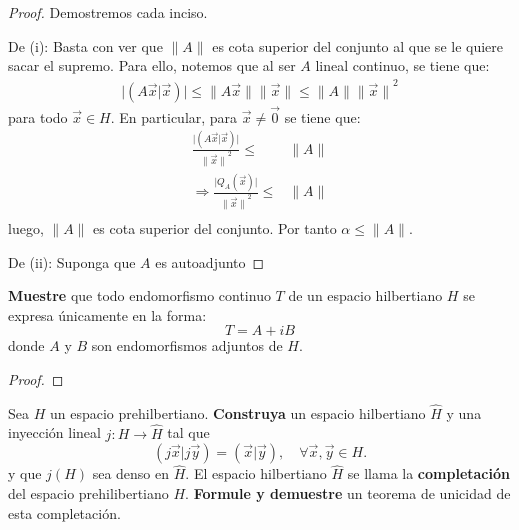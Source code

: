 \documentclass[12pt]{report}
\theoremstyle{largebreak}
\newcommand\abs[1]{\ensuremath{\big|#1\big|}}
\newcommand\cf[3]{\ensuremath{#1:#2\rightarrow#3}}
\newcommand\pint[2]{\ensuremath{\left(#1\big|#2\right)}}
\newcommand\norm[1]{\ensuremath{\|#1\|}}
\begin{document}
    \begin{proof}
        Demostremos cada inciso.

        De (i): Basta con ver que $\norm{A}$ es cota superior del conjunto al que se le quiere sacar el supremo. Para ello, notemos que al ser $A$ lineal continuo, se tiene que:
        \begin{equation*}
            \begin{split}
                \abs{\pint{A\vec{x}}{\vec{x}}} \leq \norm{A\vec{x}}\norm{\vec{x}}\leq\norm{A}\norm{\vec{x}}^2
            \end{split}
        \end{equation*}
        para todo $\vec{x}\in H$. En particular, para $\vec{x}\neq\vec{0}$ se tiene que:
        \begin{equation*}
            \begin{split}
                \frac{\abs{\pint{A\vec{x}}{\vec{x}}}}{\norm{\vec{x}}^2}\leq&\norm{A}\\
                \Rightarrow \frac{\abs{Q_A(\vec{x})}}{\norm{\vec{x}}^2}\leq&\norm{A}\\
            \end{split}
        \end{equation*}
        luego, $\norm{A}$ es cota superior del conjunto. Por tanto $\alpha\leq\norm{A}$.

        De (ii): Suponga que $A$ es autoadjunto
    \end{proof}

    \begin{excer}
        \textbf{Muestre} que todo endomorfismo continuo $T$ de un espacio hilbertiano $H$ se expresa únicamente en la forma:
        \begin{equation*}
            T=A+iB
        \end{equation*}
        donde $A$ y $B$ son endomorfismos adjuntos de $H$.
    \end{excer}

    \begin{proof}
        
    \end{proof}

    \begin{excer}
        Sea $H$ un espacio prehilbertiano. \textbf{Construya} un espacio hilbertiano $\hat{H}$ y una inyección lineal $\cf{j}{H}{\hat{H}}$ tal que
        \begin{equation*}
            \pint{j\vec{x}}{j\vec{y}}=\pint{\vec{x}}{\vec{y}},\quad\forall\vec{x},\vec{y}\in H.
        \end{equation*}
        y que $j(H)$ sea denso en $\hat{H}$. El espacio hilbertiano $\hat{H}$ se llama la \textbf{completación} del espacio prehilibertiano $H$. \textbf{Formule y demuestre} un teorema de unicidad de esta completación.
    \end{excer}
\end{document}
